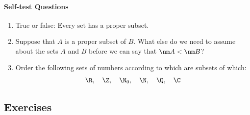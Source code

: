 \paragraph{Self-test Questions}

\begin{enumerate}
  \item True or false: Every set has a proper subset.
  \item Suppose that $A$ is a proper subset of $B$. What else do we need to assume about the sets $A$ and $B$ before we can say that $\nm A<\nm B$?
  \item Order the following sets of numbers according to which are subsets of which:
  \[\R,\quad \Z,\quad \N_0,\quad \N,\quad \Q,\quad \C\]
\end{enumerate}

\subsection*{Exercises}

